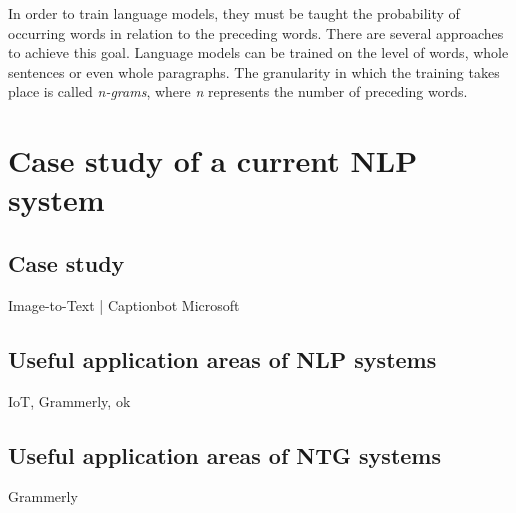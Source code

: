 In order to train language models, they must be taught the probability of occurring words in relation to the preceding words. There are several approaches to achieve this goal. Language models can be trained on the level of words, whole sentences or even whole paragraphs. The granularity in which the training takes place is called \textit{n-grams}, where \textit{n} represents the number of preceding words.

\section{Case study of a current NLP system}



\subsection{Case study}

Image-to-Text | Captionbot Microsoft

\subsection{Useful application areas of NLP systems}

IoT, Grammerly, ok

\subsection{Useful application areas of NTG systems}

Grammerly